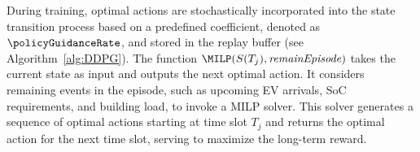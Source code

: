 During training, optimal actions are stochastically incorporated into the state transition process based on a predefined coefficient, denoted as $\policyGuidanceRate$, and stored in the replay buffer (see Algorithm~\ref{alg:DDPG}). The function $\MILP(S(T_j), {\it remainEpisode})$ takes the current state as input and outputs the next optimal action. It considers remaining events in the episode, such as upcoming EV arrivals, SoC requirements, and building load, to invoke a MILP solver. This solver generates a sequence of optimal actions starting at time slot $T_j$ and returns the optimal action for the next time slot, serving to maximize the long-term reward. 

        
